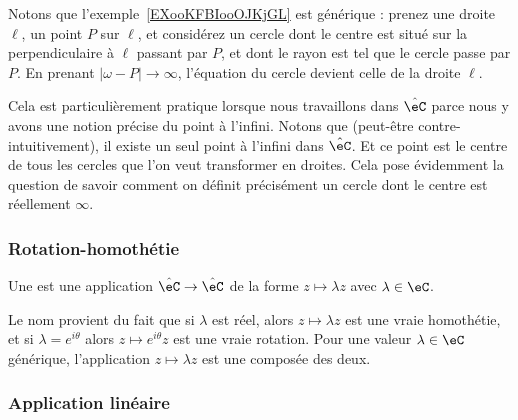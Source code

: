 \begin{normaltext}\label{NORMooCXVJooMTMqEU}
Notons que l'exemple~\ref{EXooKFBIooOJKjGL} est générique : prenez une droite \( \ell\), un point \( P\) sur \( \ell\), et considérez un cercle dont le centre est situé sur la perpendiculaire à \( \ell\) passant par \( P\), et dont le rayon est tel que le cercle passe par \( P\). En prenant \( | \omega-P |\to \infty\), l'équation du cercle devient celle de la droite \( \ell\).

Cela est particulièrement pratique lorsque nous travaillons dans \( \hat \eC\) parce nous y avons une notion précise du point à l'infini. Notons que (peut-être contre-intuitivement), il existe un seul point à l'infini dans \( \hat \eC\). Et ce point est le centre de tous les cercles que l'on veut transformer en droites. Cela pose évidemment la question de savoir comment on définit précisément un cercle dont le centre est réellement \( \infty\).
\end{normaltext}


\begin{center}
   
\end{center}

\subsubsection{Rotation-homothétie}

\begin{definition}
    Une  est une application \(  \hat \eC \to \hat \eC\) de la forme \( z\mapsto \lambda z\) avec \( \lambda\in \eC\).
\end{definition}
Le nom provient du fait que si \( \lambda\) est réel, alors \( z\mapsto \lambda z\) est une vraie homothétie, et si \( \lambda= e^{i\theta}\) alors \( z\mapsto  e^{i\theta}z\) est une vraie rotation. Pour une valeur \( \lambda\in \eC\) générique, l'application \( z\mapsto \lambda z\) est une composée des deux.

\subsubsection{Application linéaire}
\label{SSUBSooRBCWooSCIQEL}

